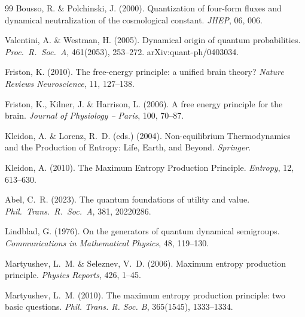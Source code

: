 \documentclass[12pt,a4paper]{article}
\theoremstyle{remark}
\begin{document}
\begin{thebibliography}{99}
Bousso, R. \& Polchinski, J. (2000).
\newblock Quantization of four-form fluxes and dynamical neutralization of the cosmological constant.
\newblock \textit{JHEP}, 06, 006.

Valentini, A. \& Westman, H. (2005).
\newblock Dynamical origin of quantum probabilities.
\newblock \textit{Proc.\ R.\ Soc.\ A}, 461(2053), 253--272. arXiv:quant-ph/0403034.

Friston, K. (2010).
\newblock The free-energy principle: a unified brain theory?
\newblock \textit{Nature Reviews Neuroscience}, 11, 127--138.

Friston, K., Kilner, J. \& Harrison, L. (2006).
\newblock A free energy principle for the brain.
\newblock \textit{Journal of Physiology -- Paris}, 100, 70--87.

Kleidon, A. \& Lorenz, R.~D. (eds.) (2004).
\newblock Non-equilibrium Thermodynamics and the Production of Entropy: Life, Earth, and Beyond.
\newblock \textit{Springer}.

Kleidon, A. (2010).
\newblock The Maximum Entropy Production Principle.
\newblock \textit{Entropy}, 12, 613--630.

Abel, C.~R. (2023).
\newblock The quantum foundations of utility and value.
\newblock \textit{Phil.\ Trans.\ R.\ Soc.\ A}, 381, 20220286.


Lindblad, G. (1976).
\newblock On the generators of quantum dynamical semigroups.
\newblock \textit{Communications in Mathematical Physics}, 48, 119--130.

Martyushev, L.~M. \& Seleznev, V.~D. (2006).
\newblock Maximum entropy production principle.
\newblock \textit{Physics Reports}, 426, 1--45.

Martyushev, L.~M. (2010).
\newblock The maximum entropy production principle: two basic questions.
\newblock \textit{Phil. Trans. R. Soc. B}, 365(1545), 1333--1334.


\end{thebibliography}
\end{document}

